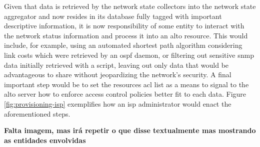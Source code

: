     Given that data is retrieved by the network state collectors into the network state aggregator and now resides in its database fully tagged with important descriptive information, it is now responsibility of some entity to interact with the network status information and process it into an \gls{alto} resource.
    This would include, for example, using an automated shortest path algorithm considering link costs which were retrieved by an \gls{ospf} daemon, or filtering out sensitive \gls{snmp} data initially retrieved with a script, leaving out only data that would be advantageous to share without jeopardizing the network's security.
    A final important step would be to set the resources \gls{acl} list as a means to signal to the \gls{alto} server how to enforce access control policies better fit to each data.  
    Figure \ref{fig:provisioning-isp} exemplifies how an \gls{isp} administrator would enact the aforementioned steps.

    \textbf{Falta imagem, mas irá repetir o que disse textualmente mas mostrando as entidades envolvidas} 


